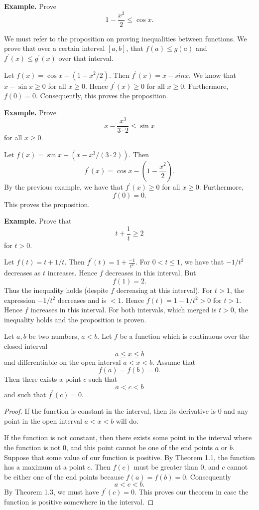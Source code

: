 \textbf{Example.} Prove
\[1 - \frac{x^2}{2} \le \cos x.\]

We must refer to the proposition on proving inequalities between functions. We prove that over a certain interval $[a,b]$, that $f(a) \le g(a)$ and $f^\prime(x) \le g^\prime(x)$ over that interval.

Let $f(x) = \cos x - (1 - x^2/2)$. Then $f^\prime(x) = x - sin x$. We know that $x - \sin x \ge 0$ for all $x \ge 0$. Hence $f^\prime(x) \ge 0$ for all $x \ge 0$. Furthermore, $f(0) = 0$. Consequently, this proves the proposition.

\textbf{Example.} Prove
\[x - \frac{x^3}{3 \cdot 2} \le \sin x\]
for all $x \ge 0$.

Let $f(x) = \sin x - (x - x^3/(3 \cdot 2))$. Then
\[f^\prime(x) = \cos x - (1 - \frac{x^2}{2}).\]
By the previous example, we have that $f^\prime(x) \ge 0$ for all $x \ge 0$. Furthermore,
\[f(0) = 0.\]
This proves the proposition.

\textbf{Example.} Prove that
\[t + \frac{1}{t} \ge 2\]
for $t > 0$.

Let $f(t) = t + 1/t$. Then $f^\prime(t) = 1 + \frac{-1}{t^2}$. For $0 < t \le 1$, we have that $-1/t^2$ decreases as $t$ increases. Hence $f$ decreases in this interval. But
\[f(1) = 2.\]
Thus the inequality holds (despite $f$ decreasing at this interval). For $t > 1$, the expression $-1/t^2$ decreases and is $< 1$. Hence $f(t) = 1 - 1/t^2 > 0$ for $t > 1$. Hence $f$ increases in this interval. For both intervals, which merged is $t > 0$, the inequality holds and the proposition is proven.

\begin{theorem}
  Let $a, b$ be two numbers, $a < b$. Let $f$ be a function which is continuous over the closed interval
  \[a \le x \le b\]
  and differentiable on the open interval $a < x < b$. Assume that
  \[f(a) = f(b) = 0.\]
  Then there exists a point $c$ such that
  \[a < c < b\]
  and such that $f^\prime(c) = 0$.
\end{theorem}

\begin{proof}
  If the function is constant in the interval, then its derivative is $0$ and any point in the open interval $a < x < b$ will do.

  If the function is not constant, then there exists some point in the interval where the function is not $0$, and this point cannot be one of the end points $a$ or $b$. Suppose that some value of our function is positive. By Theorem 1.1, the function has a maximum at a point $c$. Then $f(c)$ must be greater than $0$, and $c$ cannot be either one of the end points because $f(a) = f(b) = 0$. Consequently
  \[a < c < b.\]
  By Theorem 1.3, we must have $f^\prime(c) = 0$. This proves our theorem in case the function is positive somewhere in the interval.

\end{proof}
